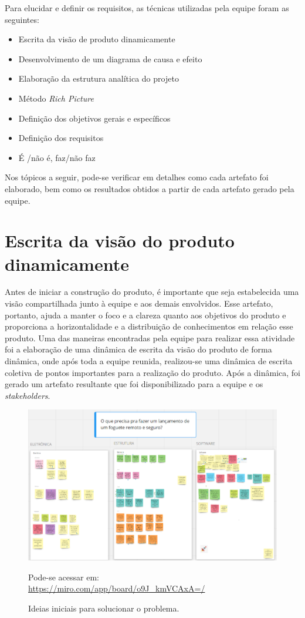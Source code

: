 Para elucidar e definir os requisitos, as técnicas utilizadas pela equipe foram as seguintes: 
\begin{itemize}

\item Escrita da visão de produto dinamicamente 
\item Desenvolvimento de um diagrama de causa e efeito 
\item Elaboração da estrutura analítica do projeto 
\item Método \textit{Rich Picture} 
\item Definição dos objetivos gerais e específicos
\item Definição dos requisitos 
\item É /não é, faz/não faz

\end{itemize}
\par Nos tópicos a seguir, pode-se verificar em detalhes como cada artefato foi elaborado, bem como os resultados obtidos a partir de cada artefato gerado pela equipe.
\section{Escrita da visão do produto dinamicamente}
\par Antes de iniciar a construção do produto, é importante que seja estabelecida uma visão compartilhada junto à equipe e aos demais envolvidos. Esse artefato, portanto, ajuda a manter o foco e a clareza quanto aos objetivos do produto e proporciona a horizontalidade e a distribuição de conhecimentos em relação esse produto. Uma das maneiras encontradas pela equipe para realizar essa atividade foi a elaboração de uma dinâmica de escrita da visão do produto de forma dinâmica, onde após toda a equipe reunida, realizou-se uma dinâmica de escrita coletiva de pontos importantes para a realização do produto. Após a dinâmica, foi gerado um artefato resultante que foi disponibilizado para a equipe e os \textit{stakeholders}. 

\begin{figure}[H]
\centering
\includegraphics[scale=0.8]{figuras/miro.png}  
\caption{Ideias iniciais para solucionar o problema.}
\footnotesize Pode-se acessar em: \url{https://miro.com/app/board/o9J_kmVCAxA=/ }
\label{fig:miro }
\end{figure}


